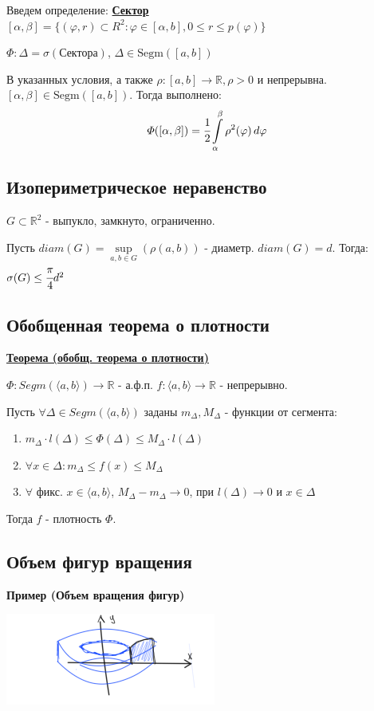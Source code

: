\documentclass{article}
\newcommand{\integral}[2]{\displaystyle\int\limits_{#1}^{#2}}
\newcommand{\Segm}{\text{Segm}}
\newcommand{\deff}[1]{\underline{\textbf{#1}}}
\newcommand{\thmm}[1]{\underline{\textbf{#1}}}
\begin{document}
Введем определение: \deff{Сектор} $[\alpha,\beta] = \{(\varphi,r)\subset R^2: \varphi\in[\alpha,b], 0\leq r\leq p(\varphi)\}$

$\varPhi: \Delta = \sigma(\text{Сектора}) $, $\Delta \in \Segm([a,b])$

В указанных условия, а также $\rho: [a,b] \rightarrow \mathbb{R}, \rho>0$ и непрерывна. $[\alpha,\beta]\in \Segm([a,b])$. Тогда выполнено: $$\varPhi([\alpha,\beta]) = \cfrac{1}{2}\integral{\alpha}{\beta}\rho^2(\varphi) \, d\varphi$$
\subsection{Изопериметрическое неравенство}

$G \subset \mathbb{R}^2$ - выпукло, замкнуто, ограниченно. 

Пусть $diam(G) = \sup\limits_{a,b\in G} (\rho(a,b))$ - диаметр. $diam(G) = d$. Тогда: $\sigma(G)\leq \cfrac{\pi}{4}d^2$

\subsection{Обобщенная теорема о плотности}

\thmm{Теорема (обобщ. теорема о плотности)}

$\varPhi: Segm(\langle a,b\rangle) \rightarrow \mathbb{R}$ - а.ф.п. $f: \langle a,b \rangle \rightarrow \mathbb{R}$ - непрерывно.

Пусть $\forall\Delta \in Segm(\langle a,b \rangle)$ заданы $m_\Delta, M_{\Delta} $ - функции от сегмента:

\begin{enumerate}
    \item $m_\Delta\cdot l(\Delta) \leq \varPhi(\Delta) \leq M_{\Delta} \cdot l(\Delta)$
    \item $\forall x  \in \Delta: m_{\Delta}\leq f(x)\leq M_{\Delta}$
    \item $\forall$ фикс. $x\in \langle a,b \rangle$, $M_{\Delta}-m_{\Delta}\rightarrow 0$, при $l(\Delta)\rightarrow 0 $ и $x\in \Delta$ 
\end{enumerate}
Тогда $f$ - плотность $\varPhi$. 

\subsection{Объем фигур вращения}

\textbf{Пример (Объем вращения фигур)}

\begin{center}
   \includegraphics[width = 10 cm]{assets/integral-v-figure.png}
\end{center}
\end{document}
